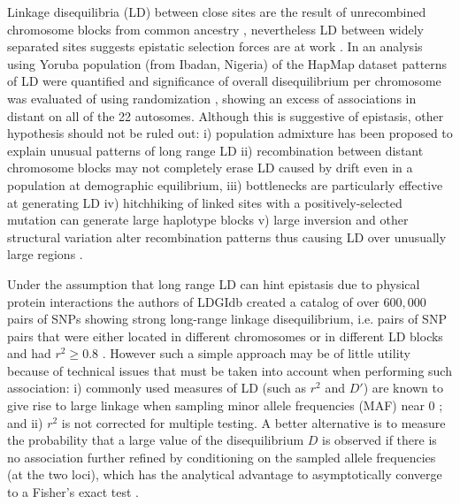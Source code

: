 Linkage disequilibria (LD) between close sites are the result of unrecombined chromosome blocks from common ancestry \cite{REF}, nevertheless LD between widely separated sites suggests epistatic selection forces are at work \cite{REF-FISHER, REF-NATURE, koch2013long}.
In an analysis using Yoruba population (from Ibadan, Nigeria) of the HapMap dataset patterns of LD were quantified and significance of overall disequilibrium per chromosome was evaluated of using randomization \cite{koch2013long}, showing an excess of associations in distant on all of the 22 autosomes. 
Although this is suggestive of epistasis, other hypothesis should not be ruled out:
i) population admixture has been proposed to explain unusual patterns of long range LD \cite{koch2013long:REF}
ii) recombination between distant chromosome blocks may not completely erase LD caused by drift even in a population at demographic equilibrium, 
iii) bottlenecks are particularly effective at generating LD
iv) hitchhiking of linked sites with a positively-selected mutation can generate large haplotype blocks 
v) large inversion and other structural variation alter recombination patterns thus causing LD over unusually large regions \cite{koch2013long:REF}.

Under the assumption that long range LD can hint epistasis due to physical protein interactions the authors of LDGIdb \cite{wang2012ldgidb} created a catalog of over $600,000$ pairs of SNPs showing strong long-range linkage disequilibrium, i.e. pairs of SNP pairs that were either located in different chromosomes or in different LD blocks and had $r^2 \ge 0.8$ \cite{wang2012ldgidb}.
However such a simple approach may be of little utility because of technical issues that must be taken into account when performing such association: i) commonly used measures of LD (such as $r^2$ and $D'$) are known to give rise to large linkage when sampling minor allele frequencies (MAF) near 0 \cite{koch2013long}; and ii) $r^2$ is not corrected for multiple testing.
A better alternative is to measure the probability that a large value of the disequilibrium $D$ is observed if there is no association further refined by conditioning on the sampled allele frequencies (at the two loci), which has the analytical advantage to asymptotically converge to a Fisher's exact test \cite{koch2013long}.

